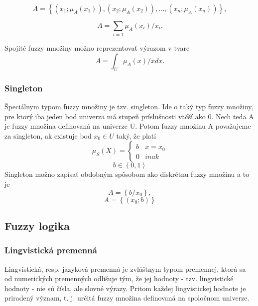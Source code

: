 \begin{equation}\label{disk2}
A = \left\lbrace 
\left( x_1; \mu_A\left( x_1\right)  \right) , 
\left( x_2; \mu_A\left( x_2\right)  \right) , ... , 
\left( x_n; \mu_A\left( x_n\right)  \right) 
\right\rbrace , 
\end{equation}

\begin{equation}\label{disk3}
A = 
\sum\limits_{i=1} \mu_A(x_i)/x_i . 
\end{equation}

Spojité fuzzy množiny možno reprezentovať výrazom v tvare \cite{gregorref1}
\begin{equation}\label{disk4}
A = \int_{U}^{}  \mu_A(x)/xdx . 
\end{equation}
\subsubsection{Singleton}
Špeciálnym typom fuzzy množiny je tzv. singleton. Ide o taký typ fuzzy množiny, pre ktorý iba jeden bod univerza má stupeň príslušnosti väčší ako 0. 
Nech teda A je fuzzy množina definovaná na univerze U. Potom fuzzy množinu A považujeme za singleton, ak existuje bod $x_0 \in U$ taký, že platí \cite{gregorUI} 
\begin{equation}\label{singleton0}
\mu_S (X) = 
\begin{cases}
b &  x = x_0 \\
0 &  inak
\end{cases}
\end{equation}
 $$ b \in \left(  0, 1 \right\rangle $$
Singleton možno zapísať obdobným spôsobom ako diskrétnu fuzzy množinu a to je \cite{gregorUI} 
\begin{equation}\label{singleton1}
A = \left\lbrace b/x_0 \right\rbrace , 
\end{equation}
\begin{equation}\label{singleton2}
A = \left\lbrace \left( x_0 ; b \right) \right\rbrace 
\end{equation}

\subsection{Fuzzy logika}
\subsubsection{Lingvistická premenná}
Lingvistická, resp. jazyková premenná je zvláštnym typom premennej, ktorá sa od numerických premenných odlišuje tým, že jej hodnoty - tzv. lingvistické hodnoty - nie sú čísla, ale slovné výrazy. Pritom každej lingvistickej hodnote je priradený význam, t. j. určitá fuzzy množina definovaná na spoločnom univerze. \cite{gregorUI}


